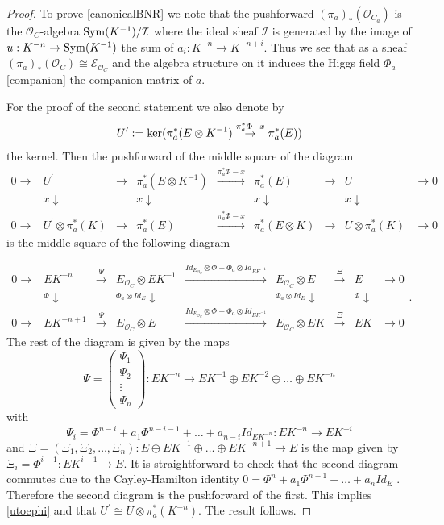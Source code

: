 \documentclass[12pt]{article}
\numberwithin{equation}{section}
\theoremstyle{remark}
\theoremstyle{definition}
\numberwithin{theorem}{section}
\def\calE{{\mathcal E}}
\def\calO{{\mathcal O}}
\renewcommand{\1}{\mathbbm{1}}
\begin{document}
\begin{proof}  To prove \eqref{canonicalBNR} we note that the pushforward $(\pi_a)_*(\calO_{C_a})$ is the $\calO_C$-algebra ${\rm Sym}(K^{-1})/{\mathcal I}$ where the ideal sheaf ${\mathcal I}$ is generated by the image of $u:K^{-n}\to {\rm Sym}(K^{-1})$ the sum  of $a_i:K^{-n}\to K^{-n+i}$. Thus we see that as a sheaf $(\pi_a)_*(\calO_C)\cong \calE_{\calO_C}$ and the algebra structure on it induces the Higgs field $\Phi_a$ \eqref{companion}  the companion matrix of $a$. 
	
	
	For the proof of the second statement we also denote 
	by $$U^\prime:={\rm ker}(\pi_a^*(E\otimes K^{-1})\stackrel{\pi_a^*\Phi-x}{\to} \pi_a^*(E))$$ the kernel. Then the pushforward of the middle square of
	the diagram $$\begin{array}{ccccccccc} 0\to  &U^\prime& \to &\pi_a^*(E\otimes K^{-1})&\stackrel{\pi_a^*\Phi-x}{\to} &\pi_a^*(E) &\to &U& \to 0 \\  & x \downarrow    &&   x \downarrow  &&  x \downarrow     &&   x \downarrow   & \\ 0\to  &U^\prime\otimes \pi_a^*(K)& \to &\pi_a^*(E)&\stackrel{\pi_a^*\Phi-x}{\to} &\pi_a^*(E\otimes K) &\to &U\otimes \pi_a^*(K) & \to 0 \end{array}$$
	is the middle square of the following diagram 
	
	$$\begin{array}{ccccccccc} 0\to  &EK^{-n}& \stackrel{\Psi}{\to }&E_{\calO_C}\otimes E K^{-1}&\stackrel{Id_{E_{\calO_C}} \otimes \Phi-\Phi_a\otimes Id_{EK^{-1}} }{\longrightarrow} &E_{\calO_C}\otimes E &\stackrel{\Xi}{\to }&E& \to 0 \\  & _\Phi \downarrow    &&   _{\Phi_a\otimes Id_E} \downarrow  &&   _{\Phi_a\otimes Id_E} \downarrow     &&   _\Phi \downarrow   & \\ 0\to  &EK^{-n+1}&  \stackrel{\Psi}{\to} &E_{\calO_C}\otimes E&\stackrel{Id_{E_{\calO_C}} \otimes \Phi-\Phi_a\otimes Id_{EK^{-1}} }{\longrightarrow} &E_{\calO_C}\otimes EK &\stackrel{\Xi}{\to} &E K & \to 0 \end{array}.$$ The rest of the diagram is given by the maps
	$$\Psi=\left(\begin{array}{c} \Psi_1\\ \Psi_2 \\ \vdots \\ \Psi_n \end{array}\right):EK^{-n}\to EK^{-1}\oplus EK^{-2}\oplus \dots \oplus EK^{-n}$$  with  $$\Psi_i=\Phi^{n-i}+a_1 \Phi^{n-i-1}+\dots + a_{n-i} Id_{EK^{-n}}:EK^{-n}\to EK^{-i}$$ and $\Xi=(\Xi_1,\Xi_2,\dots,\Xi_n): E\oplus EK^{-1}\oplus \dots \oplus EK^{-n+1}\to E$ is the map given by $\Xi_i=\Phi^{i-1}:EK^{i-1}\to E$. It is straightforward to check that the second  diagram commutes due to the Cayley-Hamilton identity $0=\Phi^n+a_1\Phi^{n-1}+\dots + a_{n} Id_E$ .  Therefore the second diagram is the pushforward of the first. This implies  \eqref{utoephi} and that $U^\prime\cong U\otimes \pi_a^*(K^{-n})$.  The result follows. 
\end{proof} 
\end{document}

